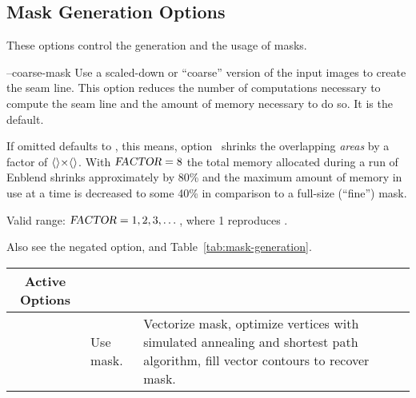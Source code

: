 

\subsection[Mask Generation Options]{Mask Generation Options
  \label{sec:mask-generation-options}
  }

These options control the generation and the usage of masks.

\begin{codelist}
  \label{opt:coarse-mask}%
\item[--coarse-mask\optional{=\metavar{FACTOR}}]\itemend Use a
  scaled-down or ``coarse''
  version of the input images to create the seam line.  This option
  reduces the number of computations necessary to compute the seam
  line and the amount of memory necessary to do so.  It is the
  default.

  If omitted  defaults to
  , this means,
  option~ shrinks the overlapping \emph{areas}
  by a factor of $\val{val:default-coarseness-factor}\classictimes
  \val{val:default-coarseness-factor}$.  With $\textsl{FACTOR} = 8$
  the total memory allocated during a run of Enblend shrinks
  approximately by 80\% and the maximum amount of memory in use at a
  time is decreased to some 40\% in comparison to a full-size
  (``fine'') mask.

  Valid range: $\textsl{FACTOR} = 1, 2, 3, \dots$, where 1 reproduces
  .

  Also see the negated option,  and
  Table~\ref{tab:mask-generation}.

  \begin{table}[htbp]
    \begin{tabular}{lp{.3\linewidth}p{.4\linewidth}}
      \hline
      \multicolumn{1}{c|}{Active Options} &
      \multicolumn{1}{c|}{\option{--no-optimize}} &
      \multicolumn{1}{c}{\option{--optimize}} \\
      \hline\extraheadingsep
      \option{--fine-mask} & Use \acronym{NFT} mask. & Vectorize
      \acronym{NFT} mask, optimize vertices with simulated
      annealing and \propername{Dijkstra's} shortest path
      algorithm, fill vector contours to recover mask. \\


\end{tabular}
\end{table}
\end{codelist}
